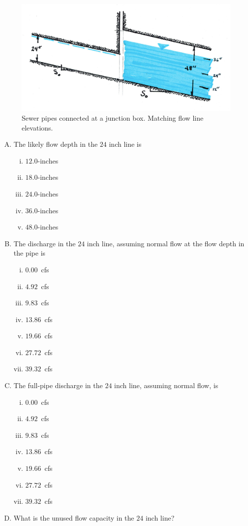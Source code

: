 \documentclass[11pt]{article}
\begin{document}
\begin{enumerate}
\begin{figure}[h!] %
\centering
   \includegraphics[width=5in]{SewerPipeMatchFlowlineDeep.jpg}
   \caption{Sewer pipes connected at a junction box.  Matching flow line elevations.}
   \label{fig:SewerPipeMatchFlowlineDeep} 
\end{figure}

\begin{enumerate}[(A)]
\item The likely flow depth in the $24$ inch line  is
\begin{enumerate} [i)]
\item $12.0$-inches 
\item $18.0$-inches 
\item $24.0$-inches 
\item $36.0$-inches
\item $48.0$-inches
\end{enumerate} 
\item The discharge in the $24$ inch line, assuming normal flow at the flow depth in the pipe is 
\begin{enumerate} [i)]
\item $0.00$~cfs
\item $4.92$~cfs
\item $9.83$~cfs
\item $13.86$~cfs 
\item $19.66$~cfs
\item $27.72$~cfs
\item $39.32$~cfs
\end{enumerate} 
\item The full-pipe discharge in the $24$ inch line, assuming normal flow, is
\begin{enumerate} [i)]
\item $0.00$~cfs
\item $4.92$~cfs
\item $9.83$~cfs
\item $13.86$~cfs 
\item $19.66$~cfs
\item $27.72$~cfs
\item $39.32$~cfs
\end{enumerate} 
\item What is the unused flow capacity in the $24$ inch line? ~\\ ~\\
\end{enumerate}





\end{enumerate}
\end{document}
